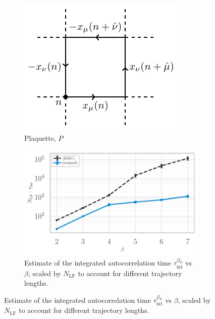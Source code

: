 \documentclass{article} %
\begin{document}
%
\begin{figure}[htpb]
   \centering
   \begin{subfigure}{0.34\textwidth}
      \includegraphics[width=\textwidth]{figures/plaq_tikz.pdf}
      \caption{\label{fig:plaquette}Plaquette, \(P\)}
   \end{subfigure}
   \hfill
   \begin{subfigure}{0.65\textwidth}
      \includegraphics[width=\textwidth]{figures/autocorr_vs_beta_blue_2120.pdf}
      \caption{\label{fig:autocorr_vs_beta}Estimate of the integrated autocorrelation time
      \(\tau_{\mathrm{int}}^{\mathcal{Q}_{\mathbb{R}}}\) vs \(\beta\), scaled by \(N_{\mathrm{LF}}\) to account for
   different trajectory lengths.}

\end{subfigure}
\end{figure}
\end{document}
